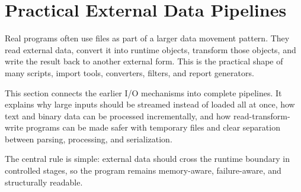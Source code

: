 \section{Practical External Data Pipelines}

Real programs often use files as part of a larger data movement pattern. They read external data, convert it into runtime objects, transform those objects, and write the result back to another external form. This is the practical shape of many scripts, import tools, converters, filters, and report generators.

This section connects the earlier I/O mechanisms into complete pipelines. It explains why large inputs should be streamed instead of loaded all at once, how text and binary data can be processed incrementally, and how read-transform-write programs can be made safer with temporary files and clear separation between parsing, processing, and serialization.

The central rule is simple: external data should cross the runtime boundary in controlled stages, so the program remains memory-aware, failure-aware, and structurally readable.